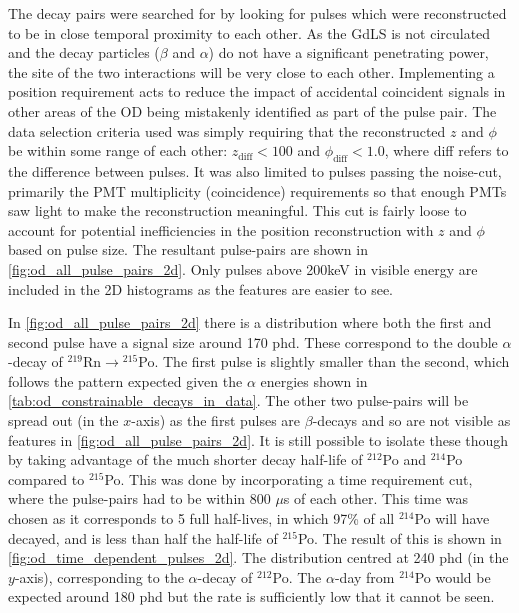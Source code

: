 \par
The decay pairs were searched for by looking for pulses which were reconstructed to be in close temporal proximity to each other.
As the GdLS is not circulated and the decay particles ($\beta$ and $\alpha$) do not have a significant penetrating power, the site of the two interactions will be very close to each other.
Implementing a position requirement acts to reduce the impact of accidental coincident signals in other areas of the OD being mistakenly identified as part of the pulse pair.
The data selection criteria used was simply requiring that the reconstructed $z$ and $\phi$ be within some range of each other: $z_{\text{diff}} < 100$ and $\phi_{\text{diff}} < 1.0$, where diff refers to the difference between pulses.
It was also limited to pulses passing the noise-cut, primarily the PMT multiplicity (coincidence) requirements so that enough PMTs saw light to make the reconstruction meaningful.
This cut is fairly loose to account for potential inefficiencies in the position reconstruction with $z$ and $\phi$ based on pulse size.
The resultant pulse-pairs are shown in \autoref{fig:od_all_pulse_pairs_2d}.
Only pulses above 200keV in visible energy are included in the 2D histograms as the features are easier to see.



\par
In \autoref{fig:od_all_pulse_pairs_2d} there is a distribution where both the first and second pulse have a signal size around 170 phd.
These correspond to the double $\alpha$-decay of ${}^{219}$Rn$\to{}^{215}$Po.
The first pulse is slightly smaller than the second, which follows the pattern expected given the $\alpha$ energies shown in \autoref{tab:od_constrainable_decays_in_data}.
The other two pulse-pairs will be spread out (in the $x$-axis) as the first pulses are $\beta$-decays and so are not visible as features in \autoref{fig:od_all_pulse_pairs_2d}.
It is still possible to isolate these though by taking advantage of the much shorter decay half-life of ${}^{212}$Po and ${}^{214}$Po compared to ${}^{215}$Po.
This was done by incorporating a time requirement cut, where the pulse-pairs had to be within 800 $\mu$s of each other.
This time was chosen as it corresponds to 5 full half-lives, in which 97\% of all ${}^{214}$Po will have decayed, and is less than half the half-life of ${}^{215}$Po.
The result of this is shown in \autoref{fig:od_time_dependent_pulses_2d}.
The distribution centred at 240 phd (in the $y$-axis), corresponding to the $\alpha$-decay of ${}^{212}$Po.
The $\alpha$-day from ${}^{214}$Po would be expected around 180 phd but the rate is sufficiently low that it cannot be seen.


